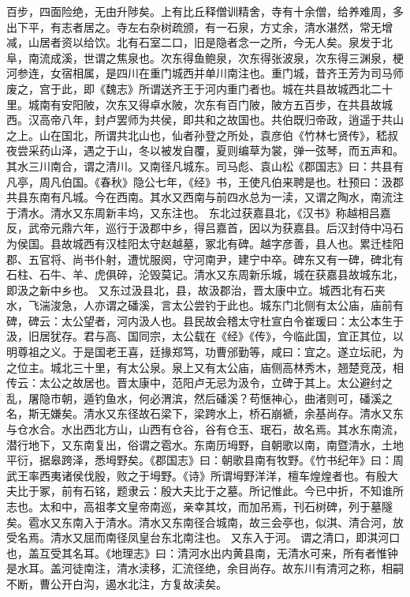 \documentclass[12pt,UTF8]{ctexbook}
\begin{document}
百步，四面险绝，无由升陟矣。上有比丘释僧训精舍，寺有十余僧，给养难周，多出下平，有志者居之。寺左右杂树疏颁，有一石泉，方丈余，清水湛然，常无增减，山居者资以给饮。北有石室二口，旧是隐者念一之所，今无人矣。泉发于北阜，南流成溪，世谓之焦泉也。次东得鱼鲍泉，次东得张波泉，次东得三渊泉，梗河参连，女宿相属，是四川在重门城西并单川南注也。重门城，昔齐王芳为司马师废之，宫于此，即《魏志》所谓送齐王于河内重门者也。城在共县故城西北二十里。城南有安阳陂，次东又得卓水陂，次东有百门陂，陂方五百步，在共县故城西。汉高帝八年，封卢罢师为共侯，即共和之故国也。共伯既归帝政，逍遥于共山之上。山在国北，所谓共北山也，仙者孙登之所处，袁彦伯《竹林七贤传》，嵇叔夜尝采药山泽，遇之于山，冬以被发自覆，夏则编草为裳，弹一弦琴，而五声和。其水三川南合，谓之清川。又南径凡城东。司马彪、袁山松《郡国志》曰：共县有凡亭，周凡伯国。《春秋》隐公七年，《经》书，王使凡伯来聘是也。杜预曰：汲郡共县东南有凡城。今在西南。其水又西南与前四水总为一渎，又谓之陶水，南流注于清水。清水又东周新丰坞，又东注也。
东北过获嘉县北，《汉书》称越相吕嘉反，武帝元鼎六年，巡行于汲郡中乡，得吕嘉首，因以为获嘉县。后汉封侍中冯石为侯国。县故城西有汉桂阳太守赵越墓，冢北有碑。越字彦善，县人也。累迁桂阳郡、五官将、尚书仆射，遭忧服阕，守河南尹，建宁中卒。碑东又有一碑，碑北有石柱、石牛、羊、虎俱碎，沦毁莫记。清水又东周新乐城，城在获嘉县故城东北，即汲之新中乡也。
又东过汲县北，县，故汲郡治，晋太康中立。城西北有石夹水，飞湍浚急，人亦谓之磻溪，言太公尝钓于此也。城东门北侧有太公庙，庙前有碑，碑云：太公望者，河内汲人也。县民故会稽太守杜宣白令崔瑗曰：太公本生于汲，旧居犹存。君与高、国同宗，太公载在《经》《传》，今临此国，宜正其位，以明尊祖之义。于是国老王喜，廷掾郑笃，功曹邠勤等，咸曰：宜之。遂立坛祀，为之位主。城北三十里，有太公泉。泉上又有太公庙，庙侧高林秀木，翘楚竞茂，相传云：太公之故居也。晋太康中，范阳卢无忌为汲令，立碑于其上。太公避纣之乱，屠隐市朝，遁钓鱼水，何必渭滨，然后磻溪？苟惬神心，曲渚则可，磻溪之名，斯无嫌矣。清水又东径故石梁下，梁跨水上，桥石崩褫，余基尚存。清水又东与仓水合。水出西北方山，山西有仓谷，谷有仓玉、珉石，故名焉。其水东南流，潜行地下，又东南复出，俗谓之雹水。东南历坶野，自朝歌以南，南暨清水，土地平衍，据皋跨泽，悉坶野矣。《郡国志》曰：朝歌县南有牧野。《竹书纪年》曰：周武王率西夷诸侯伐殷，败之于坶野。《诗》所谓坶野洋洋，檀车煌煌者也。有殷大夫比于冢，前有石铭，题隶云：殷大夫比于之墓。所记惟此。今已中折，不知谁所志也。太和中，高祖孝文皇帝南巡，亲幸其坟，而加吊焉，刊石树碑，列于墓隧矣。雹水又东南入于清水。清水又东南径合城南，故三会亭也，似淇、清合河，放受名焉。清水又屈而南径凤皇台东北南注也。
又东入于河。
谓之清口，即淇河口也，盖互受其名耳。《地理志》曰：清河水出内黄县南，无清水可来，所有者惟钟是水耳。盖河徒南注，清水渎移，汇流径绝，余目尚存。故东川有清河之称，相嗣不断，曹公开白沟，遏水北注，方复故渎矣。
\end{document}

